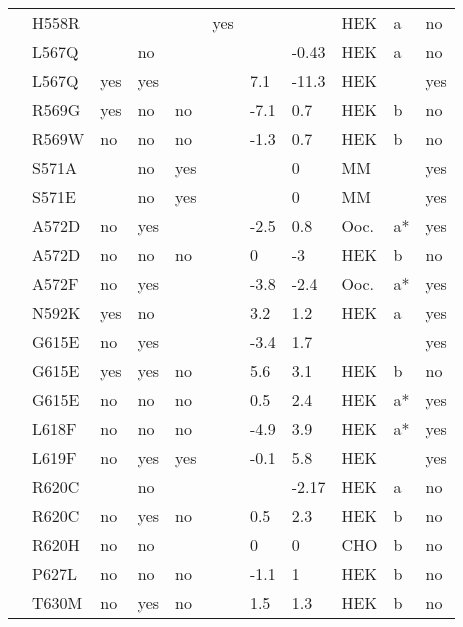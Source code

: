 \begin{tiny}
\begin{longtable}{p{4cm}|l|llll|ll|lll}
\citet{Tan2005MutationDB} & H558R &  &  &  & yes &  &  & HEK & a & no \\
\citet{Hoshi2014MutationDB} & L567Q &  & no &  &  &  & -0.43 & HEK & a & no \\
\citet{Wan2001MutationDB} & L567Q & yes & yes &  &  & 7.1 & -11.3 & HEK &  & yes \\
\citet{Kapplinger2015MutationDB} & R569G & yes & no & no &  & -7.1 & 0.7 & HEK & b & no \\
\citet{Kapplinger2015MutationDB} & R569W & no & no & no &  & -1.3 & 0.7 & HEK & b & no \\
\citet{Glynn2015MutationDB} & S571A &  & no & yes &  &  & 0 & MM &  & yes \\
\citet{Glynn2015MutationDB} & S571E &  & no & yes &  &  & 0 & MM &  & yes \\
\citet{Albert2008MutationDB} & A572D & no & yes &  &  & -2.5 & 0.8 & Ooc. & a* & yes \\
\citet{Tester2010MutationDB} & A572D & no & no & no &  & 0 & -3 & HEK & b & no \\
\citet{Albert2008MutationDB} & A572F & no & yes &  &  & -3.8 & -2.4 & Ooc. & a* & yes \\
\citet{Juang2014aMutationDB} & N592K & yes & no &  &  & 3.2 & 1.2 & HEK & a & yes \\
\citet{Albert2008MutationDB} & G615E & no & yes &  &  & -3.4 & 1.7 &  &  & yes \\
\citet{Beyder2014MutationDB} & G615E & yes & yes & no &  & 5.6 & 3.1 & HEK & b & no \\
\citet{Yang2002MutationDB} & G615E & no & no & no &  & 0.5 & 2.4 & HEK & a* & yes \\
\citet{Yang2002MutationDB} & L618F & no & no & no &  & -4.9 & 3.9 & HEK & a* & yes \\
\citet{Wehrens2003MutationDB} & L619F & no & yes & yes &  & -0.1 & 5.8 & HEK &  & yes \\
\citet{Hoshi2014MutationDB} & R620C &  & no &  &  &  & -2.17 & HEK & a & no \\
\citet{Kapplinger2015MutationDB} & R620C & no & yes & no &  & 0.5 & 2.3 & HEK & b & no \\
\citet{Calloe2013MutationDB} & R620H & no & no &  &  & 0 & 0 & CHO & b & no \\
\citet{Kapplinger2015MutationDB} & P627L & no & no & no &  & -1.1 & 1 & HEK & b & no \\
\citet{Beyder2014MutationDB} & T630M & no & yes & no &  & 1.5 & 1.3 & HEK & b & no \\

\end{longtable}
\end{tiny}
